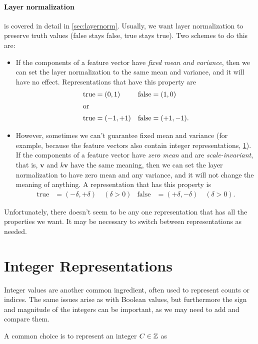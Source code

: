 \paragraph{Layer normalization} is covered in detail in \cref{sec:layernorm}. Usually, we want layer normalization to preserve truth values (false stays false, true stays true). Two schemes to do this are:
\begin{itemize}
\item If the components of a feature vector have \emph{fixed mean and variance}, then we can set the layer normalization to the same mean and variance, and it will have no effect. Representations that have this property are
  \begin{align*}
    \text{true} &= (0, 1) & \text{false} &= (1, 0) \\
    \intertext{or}
    \text{true} &= (-1, +1) & \text{false} &= (+1, -1).
  \end{align*}
\item However, sometimes we can't guarantee fixed mean and variance (for example, because the feature vectors also contain integer representations, \cref{sec:integers}). If the components of a feature vector have \emph{zero mean} and are \emph{scale-invariant}, that is, $\mathbf{v}$ and $k\mathbf{v}$ have the same meaning, then we can set the layer normalization to have zero mean and any variance, and it will not change the meaning of anything. A representation that has this property is
  \begin{align*}
    \text{true} &= (-\delta, +\delta) \quad (\delta>0) & \text{false} &= (+\delta, -\delta) \quad (\delta>0).
  \end{align*}
\end{itemize}

Unfortunately, there doesn't seem to be any one representation that has all the properties we want. It may be necessary to switch between representations as needed.

\section{Integer Representations}
\label{sec:integers}

Integer values are another common ingredient, often used to represent counts or indices. The same issues arise as with Boolean values, but furthermore the sign and magnitude of the integers can be important, as we may need to add and compare them.

A common choice is to represent an integer $C\in \mathbb{Z}$ as

